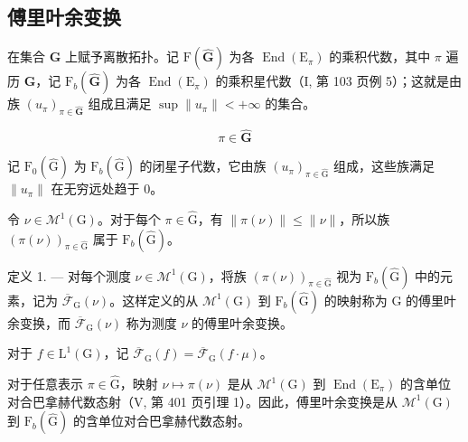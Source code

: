 \subsection{傅里叶余变换}

在集合 \(\widehat{\mathbf{G}}\) 上赋予离散拓扑。记 \(\mathrm{F}(\widehat{\mathbf{G}})\) 为各 \(\operatorname{End}(\mathrm{E}_{\pi})\) 的乘积代数，其中 \(\pi\) 遍历 \(\widehat{\mathbf{G}}\)，记 \(\mathrm{F}_b(\widehat{\mathbf{G}})\) 为各 \(\operatorname{End}(\mathrm{E}_{\pi})\) 的乘积星代数（I, 第 103 页例 5）；这就是由族 \((u_{\pi})_{\pi \in \widehat{\mathbf{G}}}\) 组成且满足 \(\sup \| u_{\pi} \| < +\infty\) 的集合。

\[
\pi \in \widehat {\mathbf {G}}
\]

记 \(\mathrm{F}_{0}(\widehat{\mathrm{G}})\) 为 \(\mathrm{F}_{b}(\widehat{\mathrm{G}})\) 的闭星子代数，它由族 \((u_{\pi})_{\pi\in\widehat{\mathrm{G}}}\) 组成，这些族满足 \(\|u_{\pi}\|\) 在无穷远处趋于 0。

令 \(\nu \in \mathcal{M}^1 (\mathrm{G})\)。对于每个 \(\pi \in \widehat{\mathrm{G}}\)，有 \(\| \pi (\nu)\| \leqslant \| \nu \|\)，所以族 \((\pi (\nu))_{\pi \in \widehat{\mathrm{G}}}\) 属于 \(\mathrm{F}_b(\widehat{\mathrm{G}})\)。

定义 1. --- 对每个测度 \(\nu \in \mathcal{M}^{1}(\mathrm{G})\)，将族 \((\pi (\nu))_{\pi \in \widehat{\mathrm{G}}}\) 视为 \(\mathrm{F}_b(\widehat{\mathrm{G}})\) 中的元素，记为 \(\overline{\mathcal{F}}_{\mathrm{G}}(\nu)\)。这样定义的从 \(\mathcal{M}^1 (\mathrm{G})\) 到 \(\mathrm{F}_b(\widehat{\mathrm{G}})\) 的映射称为 G 的傅里叶余变换，而 \(\overline{\mathcal{F}}_{\mathrm{G}}(\nu)\) 称为测度 \(\nu\) 的傅里叶余变换。

对于 \(f \in \mathrm{L}^1(\mathrm{G})\)，记 \(\overline{\mathcal{F}}_{\mathrm{G}}(f) = \overline{\mathcal{F}}_{\mathrm{G}}(f \cdot \mu)\)。

对于任意表示 \(\pi \in \widehat{\mathrm{G}}\)，映射 \(\nu \mapsto \pi(\nu)\) 是从 \(\mathcal{M}^{1}(\mathrm{G})\) 到 \(\operatorname{End}(\mathrm{E}_{\pi})\) 的含单位对合巴拿赫代数态射（V, 第 401 页引理 1）。因此，傅里叶余变换是从 \(\mathcal{M}^{1}(\mathrm{G})\) 到 \(\mathrm{F}_b(\widehat{\mathrm{G}})\) 的含单位对合巴拿赫代数态射。

